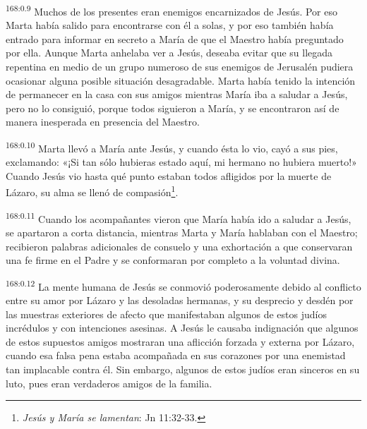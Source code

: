 \par
\textsuperscript{168:0.9} Muchos de los presentes eran enemigos encarnizados de Jesús. Por eso Marta había salido para encontrarse con él a solas, y por eso también había entrado para informar en secreto a María de que el Maestro había preguntado por ella. Aunque Marta anhelaba ver a Jesús, deseaba evitar que su llegada repentina en medio de un grupo numeroso de sus enemigos de Jerusalén pudiera ocasionar alguna posible situación desagradable. Marta había tenido la intención de permanecer en la casa con sus amigos mientras María iba a saludar a Jesús, pero no lo consiguió, porque todos siguieron a María, y se encontraron así de manera inesperada en presencia del Maestro.

\par
\textsuperscript{168:0.10} Marta llevó a María ante Jesús, y cuando ésta lo vio, cayó a sus pies, exclamando: «¡Si tan sólo hubieras estado aquí, mi hermano no hubiera muerto!» Cuando Jesús vio hasta qué punto estaban todos afligidos por la muerte de Lázaro, su alma se llenó de compasión\footnote{\textit{Jesús y María se lamentan}: Jn 11:32-33.}.

\par
\textsuperscript{168:0.11} Cuando los acompañantes vieron que María había ido a saludar a Jesús, se apartaron a corta distancia, mientras Marta y María hablaban con el Maestro; recibieron palabras adicionales de consuelo y una exhortación a que conservaran una fe firme en el Padre y se conformaran por completo a la voluntad divina.

\par
\textsuperscript{168:0.12} La mente humana de Jesús se conmovió poderosamente debido al conflicto entre su amor por Lázaro y las desoladas hermanas, y su desprecio y desdén por las muestras exteriores de afecto que manifestaban algunos de estos judíos incrédulos y con intenciones asesinas. A Jesús le causaba indignación que algunos de estos supuestos amigos mostraran una aflicción forzada y externa por Lázaro, cuando esa falsa pena estaba acompañada en sus corazones por una enemistad tan implacable contra él. Sin embargo, algunos de estos judíos eran sinceros en su luto, pues eran verdaderos amigos de la familia.

